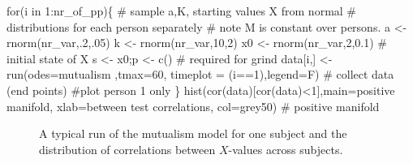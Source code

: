 \documentclass[
  a4paper,
  DIV=11,
  numbers=noendperiod,
  oneside]{scrreprt}
\newenvironment{Shaded}{}{}
\newcommand{\AttributeTok}[1]{\textcolor[rgb]{0.84,0.23,0.29}{#1}}
\newcommand{\CommentTok}[1]{\textcolor[rgb]{0.42,0.45,0.49}{#1}}
\newcommand{\ControlFlowTok}[1]{\textcolor[rgb]{0.84,0.23,0.29}{#1}}
\newcommand{\DecValTok}[1]{\textcolor[rgb]{0.00,0.36,0.77}{#1}}
\newcommand{\FloatTok}[1]{\textcolor[rgb]{0.00,0.36,0.77}{#1}}
\newcommand{\FunctionTok}[1]{\textcolor[rgb]{0.44,0.26,0.76}{#1}}
\newcommand{\NormalTok}[1]{\textcolor[rgb]{0.14,0.16,0.18}{#1}}
\newcommand{\OtherTok}[1]{\textcolor[rgb]{0.44,0.26,0.76}{#1}}
\newcommand{\SpecialCharTok}[1]{\textcolor[rgb]{0.00,0.36,0.77}{#1}}
\newcommand{\StringTok}[1]{\textcolor[rgb]{0.01,0.18,0.38}{#1}}
\begin{document}
\begin{Shaded}
\begin{Highlighting}[]
\ControlFlowTok{for}\NormalTok{(i }\ControlFlowTok{in} \DecValTok{1}\SpecialCharTok{:}\NormalTok{nr\_of\_pp)\{}
  \CommentTok{\# sample a,K, starting values X from normal }
  \CommentTok{\# distributions for each person separately}
  \CommentTok{\# note M is constant over persons.}
\NormalTok{  a }\OtherTok{\textless{}{-}} \FunctionTok{rnorm}\NormalTok{(nr\_var,.}\DecValTok{2}\NormalTok{,.}\DecValTok{05}\NormalTok{) }
\NormalTok{  k }\OtherTok{\textless{}{-}} \FunctionTok{rnorm}\NormalTok{(nr\_var,}\DecValTok{10}\NormalTok{,}\DecValTok{2}\NormalTok{)}
\NormalTok{  x0 }\OtherTok{\textless{}{-}} \FunctionTok{rnorm}\NormalTok{(nr\_var,}\DecValTok{2}\NormalTok{,}\FloatTok{0.1}\NormalTok{) }\CommentTok{\# initial state of X}
\NormalTok{  s  }\OtherTok{\textless{}{-}}\NormalTok{ x0;p }\OtherTok{\textless{}{-}} \FunctionTok{c}\NormalTok{() }\CommentTok{\# required for grind}
\NormalTok{  data[i,] }\OtherTok{\textless{}{-}} \FunctionTok{run}\NormalTok{(}\AttributeTok{odes=}\NormalTok{mutualism ,}\AttributeTok{tmax=}\DecValTok{60}\NormalTok{, }
      \AttributeTok{timeplot =}\NormalTok{ (i}\SpecialCharTok{==}\DecValTok{1}\NormalTok{),}\AttributeTok{legend=}\NormalTok{F) }\CommentTok{\# collect data (end points)}
  \CommentTok{\#plot person 1 only}
\NormalTok{\}}
\FunctionTok{hist}\NormalTok{(}\FunctionTok{cor}\NormalTok{(data)[}\FunctionTok{cor}\NormalTok{(data)}\SpecialCharTok{\textless{}}\DecValTok{1}\NormalTok{],}\AttributeTok{main=}\StringTok{\textquotesingle{}positive manifold\textquotesingle{}}\NormalTok{,}
     \AttributeTok{xlab=}\StringTok{\textquotesingle{}between test correlations\textquotesingle{}}\NormalTok{,}
     \AttributeTok{col=}\StringTok{\textquotesingle{}grey50\textquotesingle{}}\NormalTok{) }\CommentTok{\# positive manifold}
\end{Highlighting}
\end{Shaded}

\begin{figure}


\caption{\label{fig-ch6-img7-old-76}A typical run of the mutualism model
for one subject and the distribution of correlations between
\(X\)-values across subjects.}

\end{figure}%
\end{document}

